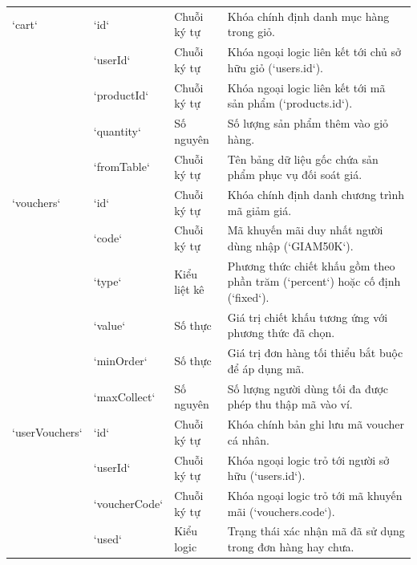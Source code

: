 \begin{table}[H]
\begin{tabularx}{\textwidth}{p{2.5cm}p{2.3cm}p{1.8cm}X}
`cart` & `id` & Chuỗi ký tự & Khóa chính định danh mục hàng trong giỏ. \\
& `userId` & Chuỗi ký tự & Khóa ngoại logic liên kết tới chủ sở hữu giỏ (`users.id`). \\
& `productId` & Chuỗi ký tự & Khóa ngoại logic liên kết tới mã sản phẩm (`products.id`). \\
& `quantity` & Số nguyên & Số lượng sản phẩm thêm vào giỏ hàng. \\
& `fromTable` & Chuỗi ký tự & Tên bảng dữ liệu gốc chứa sản phẩm phục vụ đối soát giá. \\
\addlinespace
`vouchers` & `id` & Chuỗi ký tự & Khóa chính định danh chương trình mã giảm giá. \\
& `code` & Chuỗi ký tự & Mã khuyến mãi duy nhất người dùng nhập (`GIAM50K`). \\
& `type` & Kiểu liệt kê & Phương thức chiết khấu gồm theo phần trăm (`percent`) hoặc cố định (`fixed`). \\
& `value` & Số thực & Giá trị chiết khấu tương ứng với phương thức đã chọn. \\
& `minOrder` & Số thực & Giá trị đơn hàng tối thiểu bắt buộc để áp dụng mã. \\
& `maxCollect` & Số nguyên & Số lượng người dùng tối đa được phép thu thập mã vào ví. \\
\addlinespace
`userVouchers` & `id` & Chuỗi ký tự & Khóa chính bản ghi lưu mã voucher cá nhân. \\
& `userId` & Chuỗi ký tự & Khóa ngoại logic trỏ tới người sở hữu (`users.id`). \\
& `voucherCode` & Chuỗi ký tự & Khóa ngoại logic trỏ tới mã khuyến mãi (`vouchers.code`). \\
& `used` & Kiểu logic & Trạng thái xác nhận mã đã sử dụng trong đơn hàng hay chưa. \\
\bottomrule
\end{tabularx}
\end{table}

